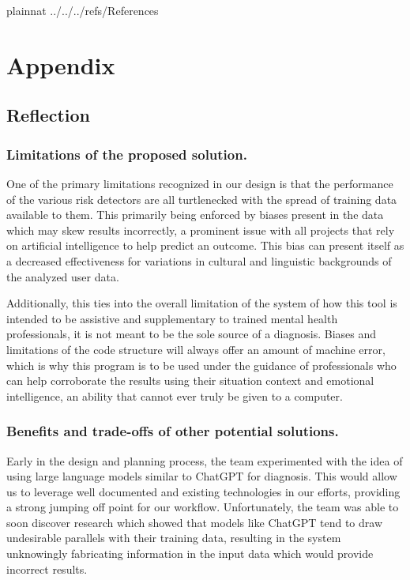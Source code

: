 \documentclass[12pt, titlepage]{article}
\begin{document}
 

\newpage

 {plainnat}
 {../../../refs/References}

\newpage

\section{Appendix} \label{Appendix}

\subsection{Reflection} 

\subsubsection{Limitations of the proposed solution.}
One of the primary limitations recognized in our design is that the performance of the various risk detectors are all turtlenecked with the spread of training data available to them. This primarily being enforced by biases present in the data which may skew results incorrectly, a prominent issue with all projects that rely on artificial intelligence to help predict an outcome. This bias can present itself as a decreased effectiveness for variations in cultural and linguistic backgrounds of the analyzed user data.

Additionally, this ties into the overall limitation of the system of how this tool is intended to be assistive and supplementary to trained mental health professionals, it is not meant to be the sole source of a diagnosis. Biases and limitations of the code structure will always offer an amount of machine error, which is why this program is to be used under the guidance of professionals who can help corroborate the results using their situation context and emotional intelligence, an ability that cannot ever truly be given to a computer.  

\subsubsection{Benefits and trade-offs of other potential solutions.}
Early in the design and planning process, the team experimented with the idea of using large language models similar to ChatGPT for diagnosis. This would allow us to leverage well documented and existing technologies in our efforts, providing a strong jumping off point for our workflow. Unfortunately, the team was able to soon discover research which showed that models like ChatGPT tend to draw undesirable parallels with their training data, resulting in the system unknowingly fabricating information in the input data which would provide incorrect results.
\end{document}
